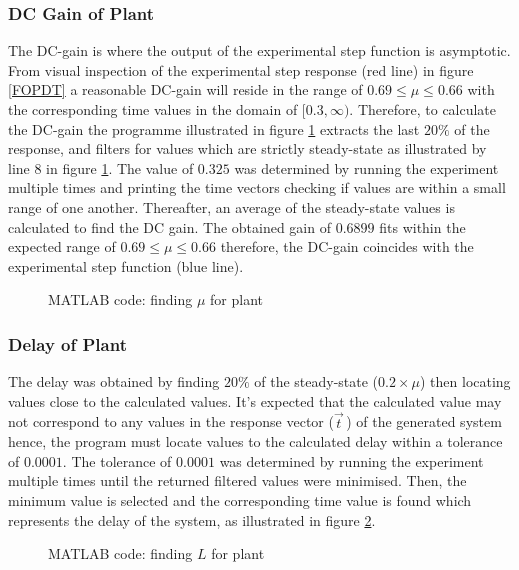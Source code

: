 \documentclass[
	12pt, %
]{fphw}
\begin{document}
\subsubsection{DC Gain of Plant}
The DC-gain is where the output of the experimental step function is asymptotic. From visual inspection of the experimental step response (red line) in figure \ref{FOPDT} a reasonable DC-gain will reside in the range of $0.69 \leq \mu \leq 0.66$ with the corresponding time values in the domain of $[0.3, \infty)$. Therefore, to calculate the DC-gain the programme illustrated in figure \ref{dcGain} extracts the last $20\%$ of the response, and filters for values which are strictly steady-state as illustrated by line 8 in figure \ref{dcGain}. The value of $0.325$ was determined by running the experiment multiple times and printing the time vectors checking if values are within a small range of one another. Thereafter, an average of the steady-state values is calculated to find the DC gain. The obtained gain of $0.6899$ fits within the expected range of $0.69 \leq \mu \leq 0.66$ therefore, the DC-gain coincides with the experimental step function (blue line).\par

\begin{figure}[htp]
    
    \caption{MATLAB code: finding $\mu$ for plant}
    \label{dcGain}
\end{figure}

\subsubsection{Delay of Plant}
The delay was obtained by finding $20\%$ of the steady-state ($0.2 \times \mu$) then locating values close to the calculated values. It's expected that the calculated value may not correspond to any values in the response vector ($\vec{t}^{\,}$) of the generated system hence, the program must locate values to the calculated delay within a tolerance of $0.0001$. The tolerance of $0.0001$ was determined by running the experiment multiple times until the returned filtered values were minimised. Then, the minimum value is selected and the corresponding time value is found which represents the delay of the system, as illustrated in figure \ref{lValue}.\par

\begin{figure}[!htb]
    
    \caption{MATLAB code: finding $L$ for plant}
    \label{lValue}
\end{figure}
\end{document}
